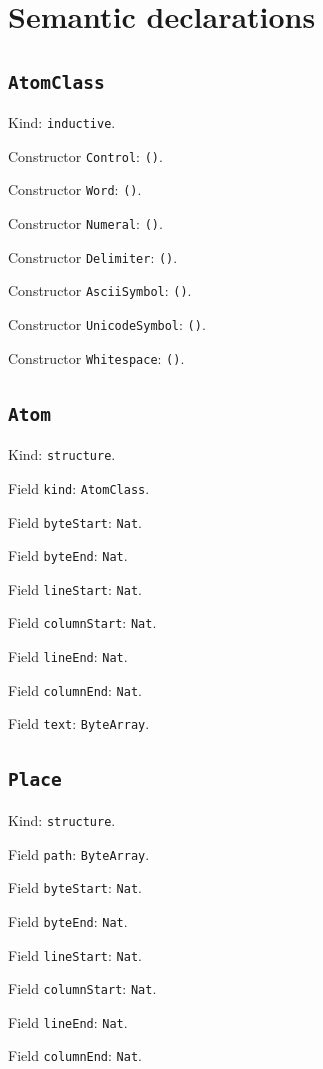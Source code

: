 \documentclass[11pt]{article}
\begin{document}
\section*{Semantic declarations}
\subsection*{\texttt{AtomClass}}
\noindent Kind: \texttt{inductive}.\par
\noindent Constructor \texttt{Control}: \texttt{()}.\par
\noindent Constructor \texttt{Word}: \texttt{()}.\par
\noindent Constructor \texttt{Numeral}: \texttt{()}.\par
\noindent Constructor \texttt{Delimiter}: \texttt{()}.\par
\noindent Constructor \texttt{AsciiSymbol}: \texttt{()}.\par
\noindent Constructor \texttt{UnicodeSymbol}: \texttt{()}.\par
\noindent Constructor \texttt{Whitespace}: \texttt{()}.\par
\subsection*{\texttt{Atom}}
\noindent Kind: \texttt{structure}.\par
\noindent Field \texttt{kind}: \texttt{AtomClass}.\par
\noindent Field \texttt{byteStart}: \texttt{Nat}.\par
\noindent Field \texttt{byteEnd}: \texttt{Nat}.\par
\noindent Field \texttt{lineStart}: \texttt{Nat}.\par
\noindent Field \texttt{columnStart}: \texttt{Nat}.\par
\noindent Field \texttt{lineEnd}: \texttt{Nat}.\par
\noindent Field \texttt{columnEnd}: \texttt{Nat}.\par
\noindent Field \texttt{text}: \texttt{ByteArray}.\par
\subsection*{\texttt{Place}}
\noindent Kind: \texttt{structure}.\par
\noindent Field \texttt{path}: \texttt{ByteArray}.\par
\noindent Field \texttt{byteStart}: \texttt{Nat}.\par
\noindent Field \texttt{byteEnd}: \texttt{Nat}.\par
\noindent Field \texttt{lineStart}: \texttt{Nat}.\par
\noindent Field \texttt{columnStart}: \texttt{Nat}.\par
\noindent Field \texttt{lineEnd}: \texttt{Nat}.\par
\noindent Field \texttt{columnEnd}: \texttt{Nat}.\par
\end{document}
